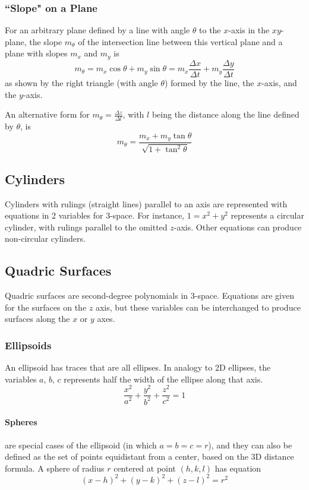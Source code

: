\documentclass{article}
\begin{document}
\subsubsection{``Slope" on a Plane}
For an arbitrary plane defined by a line with angle $\theta$ to the $x$-axis in the $xy$-plane, the slope $m_\theta$ of the intersection line between this vertical plane and a plane with slopes $m_x$ and $m_y$ is
$$m_\theta = m_x\cos{\theta} + m_y\sin{\theta}= m_x\frac{\Delta x}{\Delta t} + m_y\frac{\Delta y}{\Delta t}$$ as shown by the right triangle (with angle $\theta$) formed by the line, the $x$-axis, and the $y$-axis.

An alternative form for $m_\theta=\frac{\Delta z}{\Delta l}$, with $l$ being the distance along the line defined by $\theta$, is $$m_\theta = \frac{m_x+m_y\tan{\theta}}{\sqrt{1+\tan^2{\theta}}}$$

\subsection{Cylinders}
Cylinders with rulings (straight lines) parallel to an axis are represented with equations in 2 variables for 3-space.
For instance, $1 = x^2 + y^2$ represents a circular cylinder, with rulings parallel to the omitted $z$-axis.
Other equations can produce non-circular cylinders.

\subsection{Quadric Surfaces}
Quadric surfaces are second-degree polynomials in 3-space. Equations are given for the surfaces on the $z$ axis, but these variables can be interchanged to produce surfaces along the $x$ or $y$ axes.

\subsubsection{Ellipsoids}
An ellipsoid has traces that are all ellipses. In analogy to 2D ellipses, the variables $a$, $b$, $c$ represents half the width of the ellipse along that axis.
$$\frac{x^2}{a^2} + \frac{y^2}{b^2}+\frac{z^2}{c^2}=1$$

\paragraph{Spheres} are special cases of the ellipsoid (in which $a=b=c=r$), and they can also be defined as the set of points equidistant from a center, based on the 3D distance formula. A sphere of radius $r$ centered at point $(h, k, l)$ has equation
$$(x-h)^2+(y-k)^2+(z-l)^2=r^2$$
\end{document}
